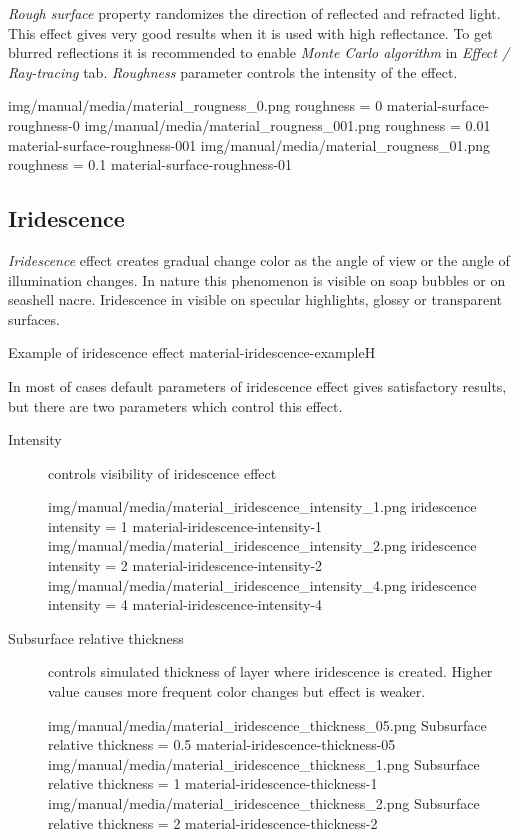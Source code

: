 \emph{Rough surface} property randomizes the direction of reflected and refracted light. This effect gives very good results when it is used with high reflectance. To get blurred reflections it is recommended to enable \emph{Monte Carlo algorithm} in \emph{Effect / Ray-tracing} tab. \emph{Roughness} parameter controls the intensity of the effect.

\threeImagesWithTwoCaptionsFullWidth
{img/manual/media/material_rougness_0.png}
{roughness = 0}
{material-surface-roughness-0}
{img/manual/media/material_rougness_001.png}
{roughness = 0.01}
{material-surface-roughness-001}
{img/manual/media/material_rougness_01.png}
{roughness = 0.1}
{material-surface-roughness-01}

\subsection{Iridescence}\label{materials-iridescence}

\emph{Iridescence} effect creates gradual change color as the angle of view or the angle of illumination changes. In nature this phenomenon is visible on soap bubbles or on seashell nacre. 
Iridescence in visible on specular highlights, glossy or transparent surfaces. 

 {Example of iridescence effect}
 {material-iridescence-example}{H}

In most of cases default parameters of iridescence effect gives satisfactory results, but there are two parameters which control this effect.

\begin{description}
	\item[Intensity] controls visibility of iridescence effect
	
	\threeImagesWithTwoCaptionsFullWidth
	{img/manual/media/material_iridescence_intensity_1.png}
	{iridescence intensity = 1}
	{material-iridescence-intensity-1}
	{img/manual/media/material_iridescence_intensity_2.png}
	{iridescence intensity = 2}
	{material-iridescence-intensity-2}
	{img/manual/media/material_iridescence_intensity_4.png}
	{iridescence intensity = 4}
	{material-iridescence-intensity-4}
	
	\item[Subsurface relative thickness] controls simulated thickness of layer where iridescence is created. Higher value causes more frequent color changes but effect is weaker.
	
	\threeImagesWithTwoCaptionsFullWidth
	{img/manual/media/material_iridescence_thickness_05.png}
	{Subsurface relative thickness = 0.5}
	{material-iridescence-thickness-05}
	{img/manual/media/material_iridescence_thickness_1.png}
	{Subsurface relative thickness = 1}
	{material-iridescence-thickness-1}
	{img/manual/media/material_iridescence_thickness_2.png}
	{Subsurface relative thickness = 2}
	{material-iridescence-thickness-2}
	
\end{description}

